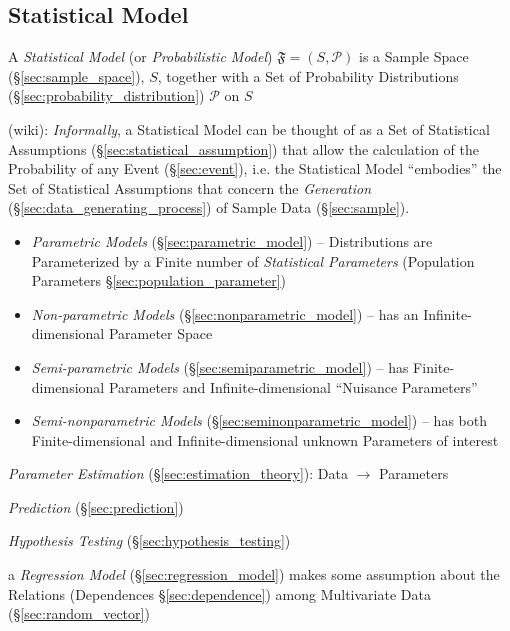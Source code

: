 \subsection{Statistical Model}\label{sec:statistical_model}

A \emph{Statistical Model} (or \emph{Probabilistic Model})
$\mathfrak{F} = (S,\mathcal{P})$ is a Sample Space (\S\ref{sec:sample_space}),
$S$, together with a Set of Probability Distributions
(\S\ref{sec:probability_distribution}) $\mathcal{P}$ on $S$

(wiki): \emph{Informally}, a Statistical Model can be thought of as a Set of
Statistical Assumptions (\S\ref{sec:statistical_assumption}) that allow the
calculation of the Probability of any Event (\S\ref{sec:event}), i.e. the
Statistical Model ``embodies'' the Set of Statistical Assumptions that concern
the \emph{Generation} (\S\ref{sec:data_generating_process}) of Sample Data
(\S\ref{sec:sample}).

\begin{itemize}
  \item \emph{Parametric Models} (\S\ref{sec:parametric_model}) -- Distributions
    are Parameterized by a Finite number of \emph{Statistical Parameters}
    (Population Parameters \S\ref{sec:population_parameter})
  \item \emph{Non-parametric Models} (\S\ref{sec:nonparametric_model})
    -- has an Infinite-dimensional Parameter Space
  \item \emph{Semi-parametric Models} (\S\ref{sec:semiparametric_model}) -- has
    Finite-dimensional Parameters and Infinite-dimensional
    ``Nuisance Parameters''
  \item \emph{Semi-nonparametric Models} (\S\ref{sec:seminonparametric_model})
    -- has both Finite-dimensional and Infinite-dimensional unknown Parameters
    of interest
\end{itemize}

\emph{Parameter Estimation} (\S\ref{sec:estimation_theory}): Data $\to$
Parameters

\emph{Prediction} (\S\ref{sec:prediction})

\emph{Hypothesis Testing} (\S\ref{sec:hypothesis_testing})

\fist a \emph{Regression Model} (\S\ref{sec:regression_model}) makes some
assumption about the Relations (Dependences \S\ref{sec:dependence}) among
Multivariate Data (\S\ref{sec:random_vector})

